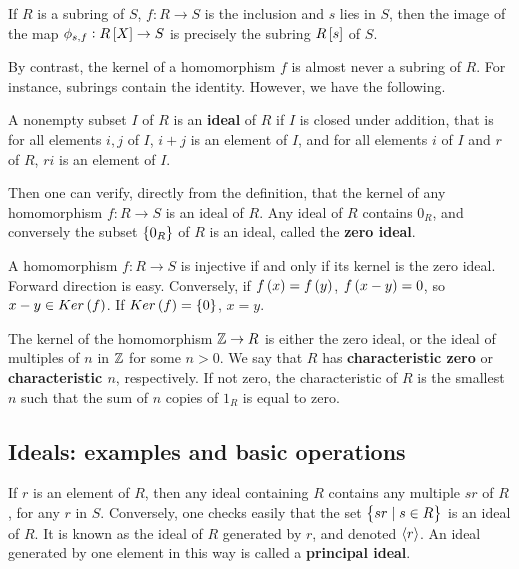 \begin{example*}
If $ R $ is a subring of $ S $, $ f : R \to S $ is the inclusion and $ s $ lies in $ S $, then the image of the map $ \phi_{s, f} : R\sbr{X} \to S $ is precisely the subring $ R\sbr{s} $ of $ S $.
\end{example*}

By contrast, the kernel of a homomorphism $ f $ is almost never a subring of $ R $. For instance, subrings contain the identity. However, we have the following.


\begin{definition}
A nonempty subset $ I $ of $ R $ is an \textbf{ideal} of $ R $ if $ I $ is closed under addition, that is for all elements $ i, j $ of $ I $, $ i + j $ is an element of $ I $, and for all elements $ i $ of $ I $ and $ r $ of $ R $, $ ri $ is an element of $ I $.
\end{definition}

Then one can verify, directly from the definition, that the kernel of any homomorphism $ f : R \to S $ is an ideal of $ R $. Any ideal of $ R $ contains $ 0_R $, and conversely the subset $ \cbr{0_R} $ of $ R $ is an ideal, called the \textbf{zero ideal}.

\begin{note*}
A homomorphism $ f : R \to S $ is injective if and only if its kernel is the zero ideal. Forward direction is easy. Conversely, if $ f\br{x} = f\br{y} $, $ f\br{x - y} = 0 $, so $ x - y \in Ker\br{f} $. If $ Ker\br{f} = \cbr{0} $, $ x = y $.
\end{note*}

The kernel of the homomorphism $ \mathbb{Z} \to R $ is either the zero ideal, or the ideal of multiples of $ n $ in $ \mathbb{Z} $ for some $ n > 0 $. We say that $ R $ has \textbf{characteristic zero} or \textbf{characteristic $ n $}, respectively. If not zero, the characteristic of $ R $ is the smallest $ n $ such that the sum of $ n $ copies of $ 1_R $ is equal to zero.

\pagebreak

\subsection{Ideals: examples and basic operations}

If $ r $ is an element of $ R $, then any ideal containing $ R $ contains any multiple $ sr $ of $ R $, for any $ r $ in $ S $. Conversely, one checks easily that the set $ \cbr{sr \mid s \in R} $ is an ideal of $ R $. It is known as the ideal of $ R $ generated by $ r $, and denoted $ \left\langle r \right\rangle $. An ideal generated by one element in this way is called a \textbf{principal ideal}.

